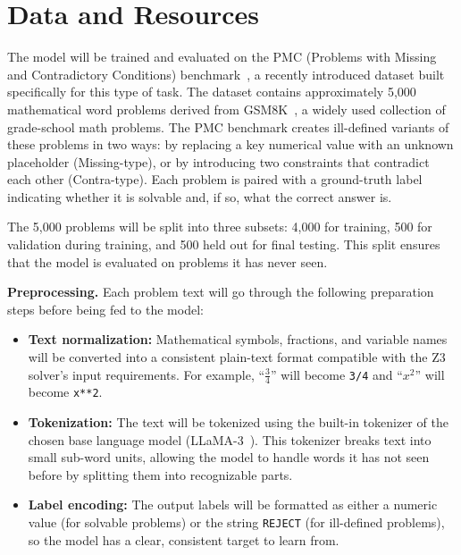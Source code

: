 \documentclass[sigconf, nonacm, onecolumn]{acmart}
\begin{document}
\section{Data and Resources}

The model will be trained and evaluated on the PMC (Problems with Missing and
Contradictory Conditions) benchmark~\cite{zhou2024}, a recently introduced dataset built
specifically for this type of task. The dataset contains approximately 5,000 mathematical
word problems derived from GSM8K~\cite{cobbe2021}, a widely used collection of
grade-school math problems. The PMC benchmark creates ill-defined variants of these
problems in two ways: by replacing a key numerical value with an unknown placeholder
(Missing-type), or by introducing two constraints that contradict each other (Contra-type).
Each problem is paired with a ground-truth label indicating whether it is solvable and, if
so, what the correct answer is.

The 5,000 problems will be split into three subsets: 4,000 for training, 500 for
validation during training, and 500 held out for final testing. This split ensures that
the model is evaluated on problems it has never seen.

\textbf{Preprocessing.} Each problem text will go through the following preparation steps
before being fed to the model:

\begin{itemize}
  \item \textbf{Text normalization:} Mathematical symbols, fractions, and variable names
  will be converted into a consistent plain-text format compatible with the Z3 solver's
  input requirements. For example, ``$\frac{3}{4}$'' will become \texttt{3/4} and
  ``$x^{2}$'' will become \texttt{x**2}.

  \item \textbf{Tokenization:} The text will be tokenized using the built-in tokenizer of
  the chosen base language model (LLaMA-3~\cite{dubey2024}). This tokenizer breaks text
  into small sub-word units, allowing the model to handle words it has not seen before by
  splitting them into recognizable parts.

  \item \textbf{Label encoding:} The output labels will be formatted as either a numeric
  value (for solvable problems) or the string \texttt{REJECT} (for ill-defined problems),
  so the model has a clear, consistent target to learn from.
\end{itemize}
\end{document}
